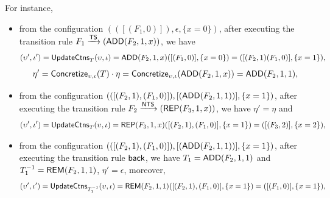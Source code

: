 \begin{example}
For instance, 
\begin{itemize}
            \item from the configuration $(([(F_1,0)]),\epsilon,\{x=0\})$, after executing the transition rule $F_1\xrightarrow{{\sf TS}}(\mathsf{ADD}(F_2,1,x))$, we have 
            $$(\upsilon', \iota') = \mathsf{UpdateCtns}_{T}(\upsilon, \iota) = \mathsf{ADD}(F_2,1,x)([(F_1,0)],\{x=0\})=([(F_2,1)(F_1,0)], \{x=1\}),$$ 
            $$\eta' = \mathsf{Concretize}_{\upsilon, \iota}(T) \cdot \eta = \mathsf{Concretize}_{\upsilon, \iota}(\mathsf{ADD}(F_2,1,x)) = \mathsf{ADD}(F_2,1,1),$$
            \item from the configuration $(([(F_2,1),(F_1,0)]),[(\mathsf{ADD}(F_2,1,1))],\{x=1\})$, after executing the transition rule $F_2\xrightarrow{{\sf NTS}}(\mathsf{REP}(F_3,1,x))$, we have $\eta' = \eta$ and
            $$(\upsilon', \iota') = \mathsf{UpdateCtns}_{T}(\upsilon, \iota) = \mathsf{REP}(F_3,1,x)([(F_2,1),(F_1,0)],\{x=1\})=([(F_3,2)], \{x=2\}),$$ 
            \item from the configuration $(([(F_2,1),(F_1,0)]),[(\mathsf{ADD}(F_2,1,1))],\{x=1\})$, after executing the transition rule ${\mathsf{back} }$, we have $T_1 = \mathsf{ADD}(F_2,1,1)$ and $T_1^{-1} = \mathsf{REM}(F_2, 1,1)$, $\eta' = \epsilon$, moreover,
            $$(\upsilon', \iota') = \mathsf{UpdateCtns}_{T_1^{-1}}(\upsilon, \iota) = \mathsf{REM}(F_2,1,1)([(F_2,1),(F_1,0)],\{x=1\})=([(F_1,0)], \{x=1\}),$$ 

\end{itemize}
\end{example}
